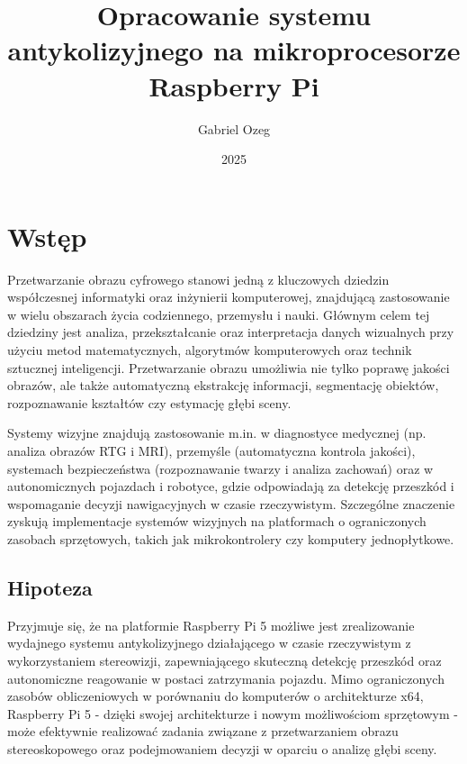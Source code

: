 \documentclass[magisterska]{pracadypl}
\author{Gabriel Ozeg}
\title{Opracowanie systemu antykolizyjnego na mikroprocesorze Raspberry Pi}
\date{2025}
\begin{document}

\maketitle
\tableofcontents
\newpage

\chapter{Wstęp}

Przetwarzanie obrazu cyfrowego stanowi jedną z kluczowych dziedzin współczesnej informatyki oraz inżynierii komputerowej, znajdującą zastosowanie w wielu obszarach życia codziennego, przemysłu i nauki. Głównym celem tej dziedziny jest analiza, przekształcanie oraz interpretacja danych wizualnych przy użyciu metod matematycznych, algorytmów komputerowych oraz technik sztucznej inteligencji. Przetwarzanie obrazu umożliwia nie tylko poprawę jakości obrazów, ale także automatyczną ekstrakcję informacji, segmentację obiektów, rozpoznawanie kształtów czy estymację głębi sceny.

Systemy wizyjne znajdują zastosowanie m.in. w diagnostyce medycznej (np. analiza obrazów RTG i MRI), przemyśle (automatyczna kontrola jakości), systemach bezpieczeństwa (rozpoznawanie twarzy i analiza zachowań) oraz w autonomicznych pojazdach i robotyce, gdzie odpowiadają za detekcję przeszkód i wspomaganie decyzji nawigacyjnych w czasie rzeczywistym. Szczególne znaczenie zyskują implementacje systemów wizyjnych na platformach o ograniczonych zasobach sprzętowych, takich jak mikrokontrolery czy komputery jednopłytkowe.

\section*{Hipoteza}

Przyjmuje się, że na platformie Raspberry Pi 5 możliwe jest zrealizowanie wydajnego systemu antykolizyjnego działającego w czasie rzeczywistym z wykorzystaniem stereowizji, zapewniającego skuteczną detekcję przeszkód oraz autonomiczne reagowanie w postaci zatrzymania pojazdu. Mimo ograniczonych zasobów obliczeniowych w porównaniu do komputerów o architekturze x64, Raspberry Pi 5 - dzięki swojej architekturze i nowym możliwościom sprzętowym - może efektywnie realizować zadania związane z przetwarzaniem obrazu stereoskopowego oraz podejmowaniem decyzji w oparciu o analizę głębi sceny.
\end{document}
